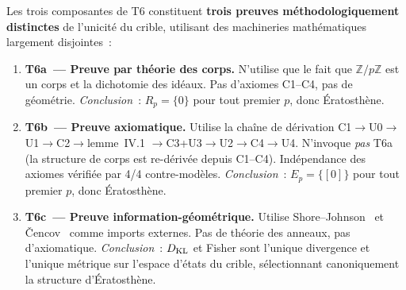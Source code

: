 \documentclass[12pt,a4paper]{article}
\begin{document}
\begin{theoreme}
\label{thm:T6_independence}
Les trois composantes de T6 constituent \textbf{trois preuves
méthodologiquement distinctes} de l'unicité du crible, utilisant des
machineries mathématiques largement disjointes~:

\begin{enumerate}[label=\textbf{(P\arabic*)}]
\item \textbf{T6a~--- Preuve par théorie des corps.}
  N'utilise que le fait que $\mathbb{Z}/p\mathbb{Z}$ est un corps et
  la dichotomie des idéaux. Pas d'axiomes C1--C4, pas de géométrie.
  \emph{Conclusion}~: $R_p = \{0\}$ pour tout premier $p$, donc
  Ératosthène.

\item \textbf{T6b~--- Preuve axiomatique.}
  Utilise la chaîne de dérivation
  C1$\to$U0$\to$U1$\to$C2$\to$lemme~IV.1
  $\to$C3+U3$\to$U2$\to$C4$\to$U4.
  N'invoque \emph{pas} T6a (la structure de corps est re-dérivée
  depuis C1--C4). Indépendance des axiomes vérifiée par 4/4
  contre-modèles.
  \emph{Conclusion}~: $E_p = \{[0]\}$ pour tout premier $p$, donc
  Ératosthène.

\item \textbf{T6c~--- Preuve information-géométrique.}
  Utilise Shore--Johnson~\cite{ShoreJohnson1980} et
  \v{C}encov~\cite{Cencov1982} comme imports externes. Pas de
  théorie des anneaux, pas d'axiomatique.
  \emph{Conclusion}~: $D_{\mathrm{KL}}$ et Fisher sont l'unique divergence et
  l'unique métrique sur l'espace d'états du crible, sélectionnant
  canoniquement la structure d'Ératosthène.
\end{enumerate}


\end{theoreme}
\end{document}
